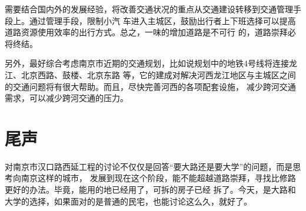 ﻿\documentclass[11pt,a4paper,onecolumn]{article}
\begin{document}
需要结合国内外的发展经验，将改善交通状况的重点从交通建设转移到交通管理手段上。通过管理手段，限制小汽
车进入主城区，鼓励出行者上下班选择可以提高道路资源使用效率的出行方式。总之，一味的增加道路是不可行
的，道路崇拜必将终结。

另外，最好综合考虑南京市近期的交通规划，比如说规划中的地铁4号线将连接龙江、北京西路、鼓楼、北京东路
等，它的建成对解决河西龙江地区与主城区之间的交通问题将有很大帮助。而且，尽快完善河西的各项配套设施，
减少跨河交通需求，可以减少跨河交通的压力。

\section{尾声}

对南京市汉口路西延工程的讨论不仅仅是回答“要大路还是要大学”的问题，而是思考向南京这样的城市，
发展到现在这个阶段，能不能超越道路崇拜，寻找比修路更好的办法。毕竟，能用的地已经用了，可拆的房子已经
拆了。今天，是大路和大学的选择，如果面对的是普通的民宅，也能讨论这么久，就好了。
\end{document}
